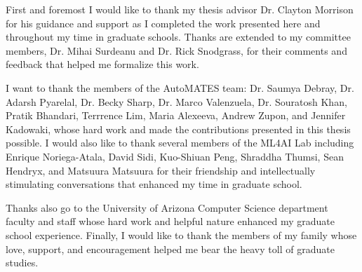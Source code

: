 First and foremost I would like to thank my thesis advisor Dr. Clayton Morrison for his guidance and support as I completed the work presented here and throughout my time in graduate schools.
Thanks are extended to my committee members, Dr. Mihai Surdeanu and Dr. Rick Snodgrass, for their comments and feedback that helped me formalize this work.

I want to thank the members of the AutoMATES team: Dr. Saumya Debray, Dr. Adarsh Pyarelal, Dr. Becky Sharp, Dr. Marco Valenzuela, Dr. Souratosh Khan, Pratik Bhandari, Terrrence Lim, Maria Alexeeva, Andrew Zupon, and Jennifer Kadowaki, whose hard work and made the contributions presented in this thesis possible.
I would also like to thank several members of the ML4AI Lab including Enrique Noriega-Atala, David Sidi, Kuo-Shiuan Peng, Shraddha Thumsi, Sean Hendryx, and Matsuura Matsuura for their friendship and intellectually stimulating conversations that enhanced my time in graduate school.

Thanks also go to the University of Arizona Computer Science department faculty and staff whose hard work and helpful nature enhanced my graduate school experience.
Finally, I would like to thank the members of my family whose love, support, and encouragement helped me bear the heavy toll of graduate studies.
